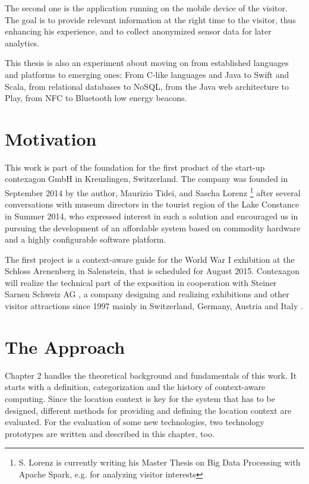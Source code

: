 The second one is the application running on the mobile device of the visitor. The goal is to provide relevant information at the right time to the visitor, thus enhancing his experience, and to collect anonymized sensor data for later analytics.

This thesis is also an experiment about moving on from established languages and platforms to emerging ones: From C-like languages and Java to Swift and Scala, from relational databases to NoSQL, from the Java web architecture to Play, from NFC to Bluetooth low energy beacons.

\section{Motivation}

This work is part of the foundation for the first product of the start-up contexagon GmbH in Kreuzlingen, Switzerland. The company was founded in September 2014 by the author, Maurizio Tidei, and Sascha Lorenz \footnote{S. Lorenz is currently writing his Master Thesis on Big Data Processing with Apache Spark, e.g. for analyzing visitor interests} after several conversations with museum directors in the tourist region of the Lake Constance in Summer 2014, who expressed interest in such a solution and encouraged us in pursuing the development of an affordable system based on commodity hardware and a highly configurable software platform.

The first project is a context-aware guide for the World War I exhibition at the Schloss Arenenberg in Salenstein, that is scheduled for August 2015. Contexagon will realize the technical part of the exposition in cooperation with Steiner Sarnen Schweiz AG , a company designing and realizing exhibitions and other visitor attractions since 1997 mainly in Switzerland, Germany, Austria and Italy \cite{steinersarnen}.

\section{The Approach}

Chapter 2 handles the theoretical background and fundamentals of this work. It starts with a definition, categorization and the history of context-aware computing.
Since the location context is key for the system that has to be designed, different methods for providing and defining the location context are evaluated. For the evaluation of some new technologies, two technology prototypes are written and described in this chapter, too.

